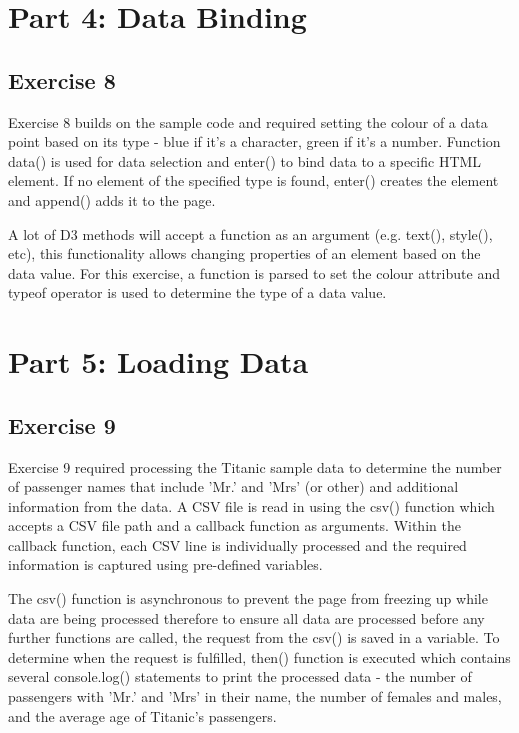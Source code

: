 \documentclass[11pt]{article}   	%
\begin{document}
\section{Part 4: Data Binding}
\subsection{Exercise 8 }
\vspace{-1em}
Exercise 8 builds on the sample code and required setting the colour of a data point based on its type - blue if it's a character, green if it's a number. Function data() is used for data selection and enter() to bind data to a specific HTML element. If no element of the specified type is found, enter() creates the element and append() adds it to the page.

A lot of D3 methods will accept a function as an argument (e.g. text(), style(), etc), this functionality allows changing properties of an element based on the data value. For this exercise, a function is parsed to set the colour attribute and typeof operator is used to determine the type of a data value.


\section{Part 5: Loading Data}
\subsection{Exercise 9 }
\vspace{-1em}
Exercise 9 required processing the Titanic sample data to determine the number of passenger names that include 'Mr.' and 'Mrs' (or other) and additional information from the data.  A CSV file is read in using the csv() function which accepts a CSV file path and a callback function as arguments. Within the callback function, each CSV line is individually processed and the required information is captured using pre-defined variables. 

The csv() function is asynchronous to prevent the page from freezing up while data are being processed therefore to ensure all data are processed before any further functions are called, the request from the csv() is saved in a variable. To determine when the request is fulfilled, then() function is executed which contains several console.log() statements to print the processed data - the number of passengers with 'Mr.' and 'Mrs' in their name, the number of females and males, and the average age of Titanic's passengers.
\end{document}
